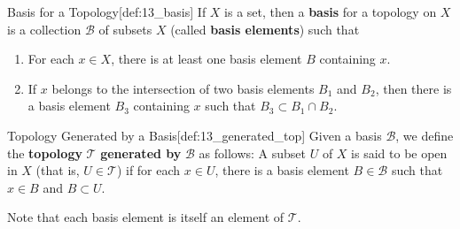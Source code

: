 \begin{defBox}{Basis for a Topology}[def:13_basis]
    If \( X \) is a set, then a \textbf{basis} for a topology on \( X \) is a collection \( \mathcal{B} \) of subsets \( X \) 
    (called \textbf{basis elements}) such that 
    \begin{enumerate}
        \item For each \( x \in X \), there is at least one basis element \( B \) containing \( x \).
        \item If \( x \) belongs to the intersection of two basis elements \( B_{ 1 } \) and \( B_{ 2 } \), then there is a 
            basis element \( B_{ 3 } \) containing \( x \) such that \( B_{ 3 } \subset B_{ 1 } \cap B_{ 2 } \).
    \end{enumerate}
\end{defBox}

\begin{defBox}{Topology Generated by a Basis}[def:13_generated_top]
    Given a basis \( \mathcal{B} \), we define the \textbf{topology} \( \mathcal{T} \) \textbf{generated by} \( \mathcal{B} \) 
    as follows: A subset \( U \) of \( X \) is said to be open in \( X \) (that is, \( U \in \mathcal{T} \)) if for each 
    \( x \in U \), there is a basis element \( B \in \mathcal{B} \) such that \( x \in B \) and \( B \subset U \).

    \baseSkip 

    Note that each basis element is itself an element of \( \mathcal{T} \).
\end{defBox}

